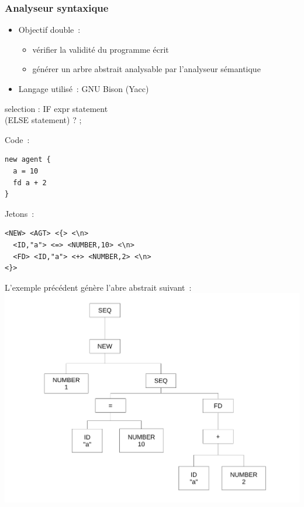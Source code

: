\begin{frame}
	\frametitle{Analyseur syntaxique}
	\begin{itemize}
	\item Objectif double~: 
		\begin{itemize}
		\item vérifier la validité du programme écrit
		\item générer un arbre abstrait analysable par l'analyseur sémantique
		\end{itemize}
	\item Langage utilisé~: GNU Bison (Yacc)
	\end{itemize}
\end{frame}

\begin{frame}[fragile]
	\begin{rail}
		selection : IF expr statement \\ (ELSE statement) ? ;
	\end{rail}
\end{frame}

\begin{frame}[fragile]
	Code~:
	\begin{lstlisting}[language=Stibbons]
new agent {
  a = 10
  fd a + 2
}
	\end{lstlisting}
	Jetons~:
	\begin{lstlisting}[breaklines]
<NEW> <AGT> <{> <\n> 
  <ID,"a"> <=> <NUMBER,10> <\n>
  <FD> <ID,"a"> <+> <NUMBER,2> <\n>
<}>
	\end{lstlisting}
\end{frame}

\begin{frame}
L'exemple précédent génère l'abre abstrait suivant~:
\includegraphics[scale=0.3]{doc/Presentation/img/arbre.pdf}
\end{frame}
